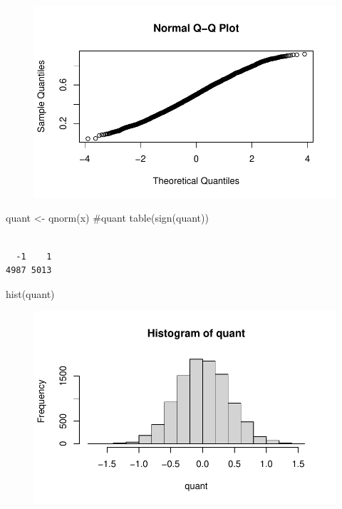 \documentclass[
  letterpaper,
  DIV=11,
  numbers=noendperiod]{scrreprt}
\newenvironment{Shaded}{\begin{snugshade}}{\end{snugshade}}
\newcommand{\CommentTok}[1]{\textcolor[rgb]{0.37,0.37,0.37}{#1}}
\newcommand{\FunctionTok}[1]{\textcolor[rgb]{0.28,0.35,0.67}{#1}}
\newcommand{\NormalTok}[1]{\textcolor[rgb]{0.00,0.23,0.31}{#1}}
\newcommand{\OtherTok}[1]{\textcolor[rgb]{0.00,0.23,0.31}{#1}}
\begin{document}
\begin{figure}[H]

{\centering \includegraphics{methods_files/figure-pdf/unnamed-chunk-4-1.pdf}

}

\end{figure}

\begin{Shaded}
\begin{Highlighting}[]
\NormalTok{quant }\OtherTok{\textless{}{-}} \FunctionTok{qnorm}\NormalTok{(x)}
\CommentTok{\#quant}
\FunctionTok{table}\NormalTok{(}\FunctionTok{sign}\NormalTok{(quant))}
\end{Highlighting}
\end{Shaded}

\begin{verbatim}

  -1    1 
4987 5013 
\end{verbatim}

\begin{Shaded}
\begin{Highlighting}[]
\FunctionTok{hist}\NormalTok{(quant)}
\end{Highlighting}
\end{Shaded}

\begin{figure}[H]

{\centering \includegraphics{methods_files/figure-pdf/unnamed-chunk-4-2.pdf}

}

\end{figure}
\end{document}
